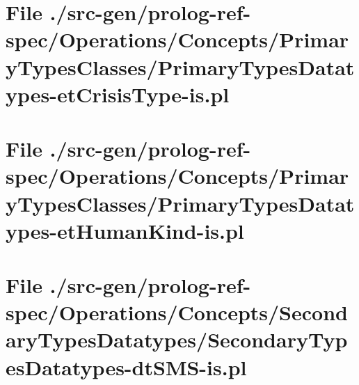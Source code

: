 \section[File /src-gen/prolog-ref-spec.../PrimaryTypesDatatypes-etCrisisType-is.pl]{File ./src-gen/prolog-ref-spec/Operations/Concepts/PrimaryTypesClasses/PrimaryTypesDatatypes-etCrisisType-is.pl}
\scriptsize

\normalsize
	
\section[File /src-gen/prolog-ref-spec.../PrimaryTypesDatatypes-etHumanKind-is.pl]{File ./src-gen/prolog-ref-spec/Operations/Concepts/PrimaryTypesClasses/PrimaryTypesDatatypes-etHumanKind-is.pl}
\scriptsize

\normalsize
	
\section[File /src-gen/prolog-ref-spec/Operations.../SecondaryTypesDatatypes-dtSMS-is.pl]{File ./src-gen/prolog-ref-spec/Operations/Concepts/SecondaryTypesDatatypes/SecondaryTypesDatatypes-dtSMS-is.pl}
\scriptsize

\normalsize
	
